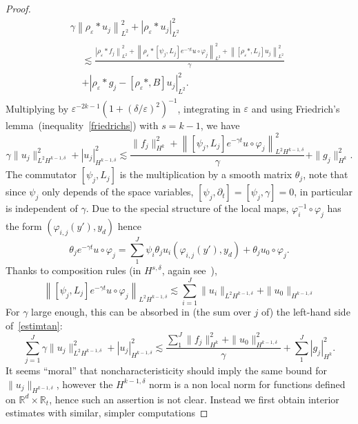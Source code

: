 \documentclass[AHL,Unicode,longabstracts,published]{cedram}
\newcommand{\R}{\mathbb{R}}
\begin{document}
\begin{proof}
\begin{multline*}
\gamma \left\|\rho_\varepsilon*u_j\right\|_{L^2}^2 +\left|\rho_\varepsilon*u_j\right|_{L^2}^2 \\
\begin{aligned}
&\lesssim
\frac{\left|\rho_\varepsilon*f_j\right\|_{L^2}^2 +\left\|\rho_\varepsilon*\left[\psi_j,L_j\right]e^{-\gamma t}u\circ\varphi_j\right\|_{L^2}^2+\left\|\left[\rho_\varepsilon*,L_j \right]u_j\right\|^2_{L^2}}{\gamma}\\
& +\left|\rho_\varepsilon*g_j-\left[\rho_\varepsilon*,B\right]u_j\right|_{L^2}^2.
\end{aligned}
\end{multline*}
Multiplying by $\varepsilon^{-2k-1}
\left(1+(\delta/\varepsilon)^2
\right)^{-1}$, integrating in $\varepsilon$ and using Friedrich's lemma~(inequality~\eqref{friedrichs}) with $s=k-1$, we have
\begin{equation}\label{estimtan}
\gamma \|u_j\|_{L^2H^{k-1,\delta}}^2+ |u_j|_{H^{k-1,\delta}}^2\lesssim
\frac{\|f_j\|_{H^k}^2+\left\|\left[\psi_j,L_j\right] e^{-\gamma t}u\circ \varphi_j\right\|_{L^2H^{k-1,\delta}}^2}{\gamma}+ \|g_j\|_{H^k}^2.
\end{equation}
The commutator $[\psi_j,L_j]$ is the multiplication by a smooth matrix $\theta_j$, note that since $\psi_j$ only depends of the space variables, $[\psi_j,\partial_t]=[\psi_j,\gamma]=0$, in particular is independent of $\gamma$. Due to the special structure of the local maps, $\varphi_i^{-1}
\circ\varphi_j$ has the form $(\varphi_{i,j}(y'),y_d)$ hence
\[
\theta_j e^{-\gamma t}u\circ \varphi_j=
\sum_1^J \psi_i\theta_ju_i(\varphi_{i,j}(y'),y_d)+\theta_ju_0\circ \varphi_j.
\]
Thanks to composition rules (in $H^{s,\delta}$, again see~\cite{ChaPi}),
\[
\left\|\left[\psi_j,L_j\right]e^{-\gamma t}u\circ \varphi_j\right\|_{L^2H^{k-1,\delta}}\lesssim \sum_{i=1}^J \|u_i\|_{L^2H^{k-1,\delta}} +\|u_0\|_{H^{k-1,\delta}}
\]
For $\gamma$ large enough, this can be absorbed in (the sum over $j$ of) the left-hand side of~\eqref{estimtan}:
\begin{equation}\label{estimtan2}
\sum_{j=1}^J\gamma \|u_j\|_{L^2H^{k-1,\delta}}^2+ |u_j|_{H^{k-1,\delta}}^2\lesssim
\frac{\sum_1^J\|f_j\|_{H^k}^2+\|u_0\|_{H^{k-1,\delta}}^2}{\gamma}+ \sum_1^J|g_j|_{H^k}^2.
\end{equation}
It seems ``moral'' that noncharacteristicity should imply the same bound for $\|u_j\|_{H^{k-1,\delta}}$, however the $H^{k-1,\delta}$ norm is a non local norm for functions defined on $\R^d\times \R_t$, hence such an assertion is not clear. Instead we first obtain interior estimates with similar, simpler computations

\end{proof}
\end{document}
